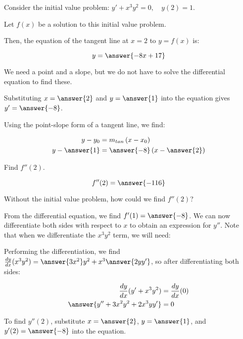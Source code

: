\documentclass{ximera}
\author{Jim Talamo}
\begin{document}
\begin{exercise}
Consider the initial value problem: $y' +x^3y^2 = 0, \quad y(2)=1$.

Let $f(x)$ be a solution to this initial value problem.

Then, the equation of the tangent line at $x=2$ to $y=f(x)$ is:

\[
y = \answer{-8x+17}
\]

\begin{hint}
We need a point and a slope, but we do not have to solve the differential equation to find these.

Substituting $x=\answer{2}$ and $y=\answer{1}$ into the equation gives $y' = \answer{-8}$.  

Using the point-slope form of a tangent line, we find:

\begin{align*}
y-y_0 &= m_{tan} \left(x-x_0\right) \\
y-\answer{1} &= \answer{-8} \left(x-\answer{2}\right)
\end{align*}
\end{hint}

\begin{exercise}

Find $f''(2)$.

\[
f''(2) = \answer{-116 }
\]
\begin{hint}
Without the initial value problem, how could we find $f''(2)$?

\begin{multipleChoice}
\end{multipleChoice}

From the differential equation, we find $f'(1) = \answer{-8}$.  We can now differentiate both sides with respect to $x$ to obtain an expression for $y''$.  Note that when we differentiate the $x^3y^2$ term, we will need:

\begin{selectAll}
\end{selectAll}

Performing the differentiation, we find $\frac{dy}{dx} (x^3y^2) = \answer{3x^2}y^2 + x^3 \answer{2yy'}$, so after differentiating both sides:

\begin{align*}
\frac{dy}{dx}(y' +x^3y^2) &= \frac{dy}{dx}(0) \\
\answer{y''+3x^2y^2+2x^3yy'} &= 0\\
\end{align*}

To find $y''(2)$, substitute $x=\answer{2}$, $y=\answer{1}$, and $y'(2) = \answer{-8}$ into the equation.
\end{hint}

\end{exercise}
\end{exercise}
\end{document}
